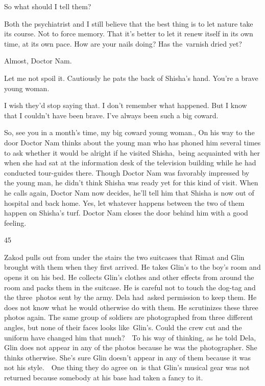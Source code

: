 \documentclass[letterpaper]{article}
\begin{document}
{\textquotedbl}So what should I tell them?{\textquotedbl} 

{\textquotedbl}Both the psychiatrist and I still believe that the best thing is to let nature take its course. Not to
force memory. That it's better to let it renew itself in its own time, at its own pace. How are your nails doing? Has
the~varnish dried yet?{\textquotedbl} 

{\textquotedbl}Almost, Doctor Nam.{\textquotedbl} 

{\textquotedbl}Let me not spoil it.{\textquotedbl} Cautiously he pats the back of Shisha's hand. {\textquotedbl}You're a
brave young woman.{\textquotedbl} 

{\textquotedbl}I wish they'd stop saying that. I don't remember what happened. But I know that I couldn't have been
brave. I've always been such a big coward.{\textquotedbl} 

{\textquotedbl}So, see you in a month's time, my big coward young woman.,{\textquotedbl} On his way to the door Doctor
Nam thinks about the young man who has phoned him several times to ask whether it would be alright if he visited
Shisha,\ being acquainted with her when she had sat at the information desk of the television building while he had
conducted tour-guides there. Though Doctor Nam was favorably impressed by the young man, he didn't think Shisha was
ready yet for this kind of visit. When he calls again, Doctor Nam now decides, he'll tell him that Shisha is now out of
hospital and back home. Yes, let whatever happens between the two of them happen on Shisha's turf. Doctor Nam closes
the door behind him with a good feeling.\ 


\bigskip

45\ \ 

Zakod pulls out from under the stairs the two suitcases that Rimat and Glin brought with them when they first arrived.
He takes Glin's to the boy's room and opens it on his bed. He collects Glin's clothes and other effects from around the
room and packs them in the suitcase. He is careful not to touch the dog-tag and the three~photos sent by the army. Dela
had~asked permission to keep them. He does not know what he would otherwise do with them. He scrutinizes these three
photos again. The same group of soldiers are photographed from three different angles, but none of their faces looks
like\ Glin's. Could the crew cut and the uniform have changed him that much?\ \ To his way of thinking, as he told
Dela, Glin does not appear in any of the photos because he was the photographer. She thinks otherwise. She's sure Glin
doesn't appear in any of them because it was not his style.\ \ One thing they do agree on\ is that Glin's musical gear
was not returned because somebody at his base had taken a fancy to it. 
\end{document}
